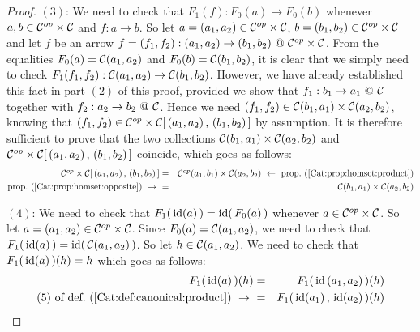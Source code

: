 \begin{proof}
    $(3)$: We need to check that $F_{1}(f):F_{0}(a)\to F_{0}(b)$ whenever
    $a,b\in\mbox{${\cal C}^{op}$}\times\mbox{$\cal C$}$ and $f:a\to b$. So let $a=(a_{1},a_{2})\in\mbox{${\cal C}^{op}$}
    \times\mbox{$\cal C$}$, $b=(b_{1},b_{2})\in\mbox{${\cal C}^{op}$}\times\mbox{$\cal C$}$ and let $f$ be an 
    arrow $f=(f_{1},f_{2}):(a_{1},a_{2})\to(b_{1},b_{2})\ @\ \Cop\times\Cat$. 
    From the equalities $F_{0}(a)=\mbox{$\cal C$}(a_{1},a_{2})$ and $F_{0}(b)=\mbox{$\cal C$}
    (b_{1},b_{2})$, it is clear that we simply need to check 
    $F_{1}(f_{1},f_{2}):\mbox{$\cal C$}(a_{1},a_{2})\to \mbox{$\cal C$}(b_{1},b_{2})$.
    However, we have already established this fact in part $(2)$ of this 
    proof, provided we show that $f_{1}:b_{1}\to a_{1}\ @\ \mbox{$\cal C$}$ together 
    with $f_{2}:a_{2}\to b_{2}\ @\ \mbox{$\cal C$}$. Hence we need
    $(f_{1},f_{2})\in\mbox{$\cal C$}(b_{1},a_{1})\times\mbox{$\cal C$}(a_{2},b_{2})$, knowing
    that $(f_{1},f_{2})\in\mbox{${\cal C}^{op}$}\times\mbox{$\cal C$}[\,(a_{1},a_{2})\,,\,(b_{1},b_{2})
    \,]$ by assumption. It is therefore sufficient to prove that the 
    two collections $\mbox{$\cal C$}(b_{1},a_{1})\times\mbox{$\cal C$}(a_{2},b_{2})$ and
    $\mbox{${\cal C}^{op}$}\times\mbox{$\cal C$}[\,(a_{1},a_{2})\,,\,(b_{1},b_{2})\,]$ coincide, which 
    goes as follows:
        \begin{eqnarray*}\Cop\times\Cat[\,(a_{1},a_{2})\,,\,(b_{1},b_{2})\,]
            &=&\Cop(a_{1},b_{1})\times\Cat(a_{2},b_{2})\ \leftarrow\ 
            \mbox{prop.~(\ref{Cat:prop:homset:product})}\\
            \mbox{prop.~(\ref{Cat:prop:homset:opposite})}\ \to\ 
            &=&\Cat(b_{1},a_{1})\times\Cat(a_{2},b_{2})
        \end{eqnarray*}

    $(4)$: We need to check that $F_{1}(\,\mbox{\rm id}(a)\,)=\mbox{\rm id}(\,F_{0}(a)\,)$ whenever
    $a\in\mbox{${\cal C}^{op}$}\times\mbox{$\cal C$}$. So let $a=(a_{1},a_{2})\in\mbox{${\cal C}^{op}$}\times\mbox{$\cal C$}$. Since
    $F_{0}(a)=\mbox{$\cal C$}(a_{1},a_{2})$, we need to check that $F_{1}(\,\mbox{\rm id}(a)\,)
    =\mbox{\rm id}(\,\mbox{$\cal C$}(a_{1},a_{2})\,)$. So let $h\in\mbox{$\cal C$}(a_{1},a_{2})$. We need to
    check that $F_{1}(\,\mbox{\rm id}(a)\,)(h)=h$ which goes as follows:
        \begin{eqnarray*}F_{1}(\,\id(a)\,)(h)
            &=&F_{1}(\,\id\,(a_{1},a_{2})\,)(h)\\
            \mbox{$(5)$ of def.~(\ref{Cat:def:canonical:product})}\ \to\ 
            &=&F_{1}(\,\id(a_{1})\,,\,\id(a_{2})\,)(h)
        \end{eqnarray*}
\end{proof}
